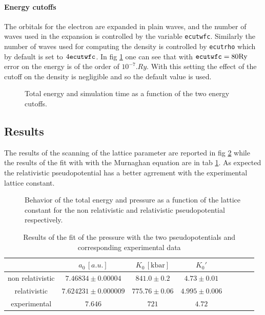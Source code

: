 \documentclass[a4paper, 11pt]{article}
\begin{document}
  \paragraph{Energy cutoffs}
    The orbitals for the electron are expanded in plain waves, and the number of waves used in the expansion is controlled by the variable \verb|ecutwfc|. Similarly the number of waves used for computing the density is controlled by \verb|ecutrho| which by default is set to $4\verb|ecutwfc|$. In fig \ref{fig:bulk_ecut} one can see that with $ \verb|ecutwfc| = 80 \si{.Ry}$ error on the energy is of the order of $10^{-7} \si{.Ry}$. With this setting the effect of the cutoff on the density is negligible and so the default value is used.

    \begin{figure}
      \centering
      \caption{Total energy and simulation time as a function of the two energy cutoffs.}
      \label{fig:bulk_ecut}
    \end{figure}

  \subsection{Results}
    The results of the scanning of the lattice parameter are reported in fig \ref{fig:bulk_a} while the results of the fit with with the Murnaghan equation are in tab \ref{tab:bulk_a}. As expected the relativistic pseudopotential has a better agrrement with the experimental lattice constant.

  \begin{figure}
    \centering
    \caption{Behavior of the total energy and pressure as a function of the lattice constant for the non relativistic and relativistic pseudopotential respectively.}
    \label{fig:bulk_a}
  \end{figure}

  \begin{table}
    \centering
    \begin{tabular}{cccccccc}
      \toprule
        & $a_0\, [a.u.]$ & $K_0\, [\si{\kilo\bar}]$ & $K_0'$ \\
      \midrule
      non relativistic & $7.46834 \pm 0.00004$ & $841.0 \pm 0.2$ & $4.73 \pm 0.01$ \\
      relativistic & $7.624231 \pm 0.000009$ & $775.76 \pm 0.06$ & $4.995 \pm 0.006$ \\
      \midrule
      experimental \cite{rif:bulk_exp_data} & $7.646$ & $721$ & $4.72$ \\
      \bottomrule
    \end{tabular}
    \caption{Results of the fit of the pressure with the two pseudopotentials and corresponding experimental data}
    \label{tab:bulk_a}
  \end{table}
\end{document}
